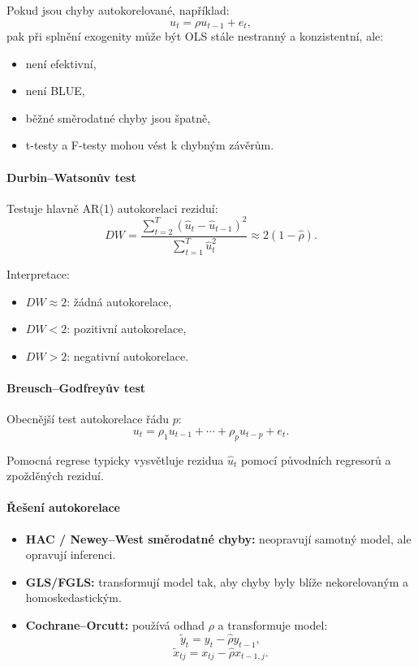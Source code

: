Pokud jsou chyby autokorelované, například:
\[
    u_t=\rho u_{t-1}+e_t,
\]
pak při splnění exogenity může být OLS stále nestranný a konzistentní, ale:
\begin{itemize}
    \item není efektivní,
    \item není BLUE,
    \item běžné směrodatné chyby jsou špatně,
    \item t-testy a F-testy mohou vést k chybným závěrům.
\end{itemize}

\paragraph{Durbin--Watsonův test}

Testuje hlavně AR(1) autokorelaci reziduí:
\[
    DW=
    \frac{\sum_{t=2}^{T}(\hat u_t-\hat u_{t-1})^2}
    {\sum_{t=1}^{T}\hat u_t^2}
    \approx 2(1-\hat\rho).
\]

Interpretace:
\begin{itemize}
    \item $DW\approx 2$: žádná autokorelace,
    \item $DW<2$: pozitivní autokorelace,
    \item $DW>2$: negativní autokorelace.
\end{itemize}

\paragraph{Breusch--Godfreyův test}

Obecnější test autokorelace řádu $p$:
\[
    u_t=\rho_1u_{t-1}+\cdots+\rho_pu_{t-p}+e_t.
\]

Pomocná regrese typicky vysvětluje rezidua $\hat u_t$ pomocí původních regresorů a zpožděných reziduí.

\paragraph{Řešení autokorelace}

\begin{itemize}
    \item \textbf{HAC / Newey--West směrodatné chyby:} neopravují samotný model, ale opravují inferenci.
    \item \textbf{GLS/FGLS:} transformují model tak, aby chyby byly blíže nekorelovaným a homoskedastickým.
    \item \textbf{Cochrane--Orcutt:} používá odhad $\rho$ a transformuje model:
    \[
        \widetilde y_t=y_t-\hat\rho y_{t-1},
    \]
    \[
        \widetilde x_{tj}=x_{tj}-\hat\rho x_{t-1,j}.
    \]
\end{itemize}

